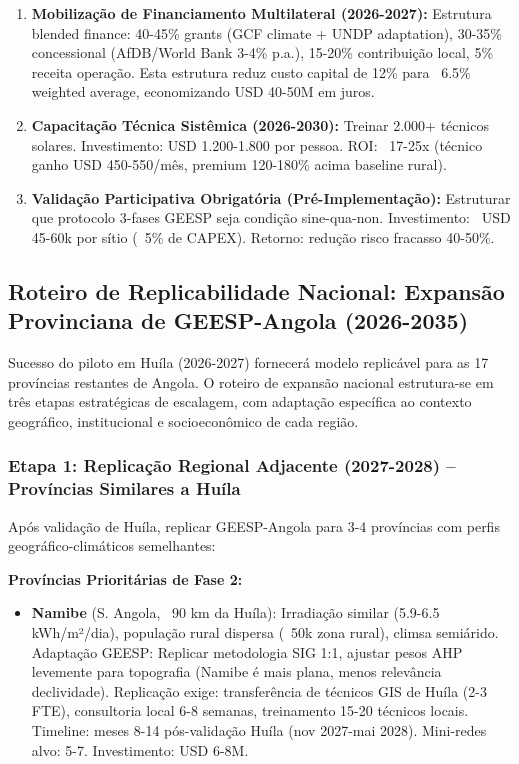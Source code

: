 \documentclass[12pt, a4paper]{article}
\begin{document}
{{{{{{{{{{{{\begin{enumerate}
\item \textbf{Mobilização de Financiamento Multilateral (2026-2027):} Estrutura blended finance: 40-45\% grants (GCF climate + UNDP adaptation), 30-35\% concessional (AfDB/World Bank 3-4\% p.a.), 15-20\% contribuição local, 5\% receita operação. Esta estrutura reduz custo capital de 12\% para ~6.5\% weighted average, economizando USD 40-50M em juros.

\item \textbf{Capacitação Técnica Sistêmica (2026-2030):} Treinar 2.000+ técnicos solares. Investimento: USD 1.200-1.800 por pessoa. ROI: ~17-25x (técnico ganho USD 450-550/mês, premium 120-180\% acima baseline rural).

\item \textbf{Validação Participativa Obrigatória (Pré-Implementação):} Estruturar que protocolo 3-fases GEESP seja condição sine-qua-non. Investimento: ~USD 45-60k por sítio (~5\% de CAPEX). Retorno: redução risco fracasso 40-50\%.
\end{enumerate}

\subsection{Roteiro de Replicabilidade Nacional: Expansão Provinciana de GEESP-Angola (2026-2035)}

Sucesso do piloto em Huíla (2026-2027) fornecerá modelo replicável para as 17 províncias restantes de Angola. O roteiro de expansão nacional estrutura-se em três etapas estratégicas de escalagem, com adaptação específica ao contexto geográfico, institucional e socioeconômico de cada região.

\subsubsection{Etapa 1: Replicação Regional Adjacente (2027-2028) -- Províncias Similares a Huíla}

Após validação de Huíla, replicar GEESP-Angola para 3-4 províncias com perfis geográfico-climáticos semelhantes:

\textbf{Províncias Prioritárias de Fase 2:}
\begin{itemize}
\item \textbf{Namibe} (S. Angola, ~90 km da Huíla): Irradiação similar (5.9-6.5 kWh/m²/dia), população rural dispersa (~50k zona rural), climsa semiárido. Adaptação GEESP: Replicar metodologia SIG 1:1, ajustar pesos AHP levemente para topografia (Namibe é mais plana, menos relevância declividade). Replicação exige: transferência de técnicos GIS de Huíla (2-3 FTE), consultoria local 6-8 semanas, treinamento 15-20 técnicos locais. Timeline: meses 8-14 pós-validação Huíla (nov 2027-mai 2028). Mini-redes alvo: 5-7. Investimento: USD 6-8M.


\end{itemize}}}}}}}}}}}}}
\end{document}
